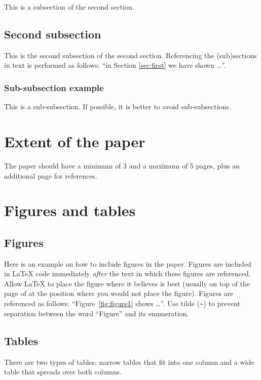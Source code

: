 \documentclass[10pt, a4paper]{article}
\begin{document}
This is a subsection of the second section.

\subsection{Second subsection}

This is the second subsection of the second section. Referencing the (sub)sections in text is performed as follows: ``in Section \ref{sec:first} we have shown \dots''.

\subsubsection{Sub-subsection example} 

This is a sub-subsection. If possible, it is better to avoid sub-subsections. 

\section{Extent of the paper}

The paper should have a minimum of 3 and a maximum of 5 pages, plus an additional page for references.

\section{Figures and tables}

\subsection{Figures}

Here is an example on how to include figures in the paper. Figures are included in \LaTeX{} code immediately \textit{after} the text in which these figures are referenced. Allow \LaTeX{} to place the figure where it believes is best (usually on top of the page of at the position where you would not place the figure). Figures are referenced as follows: ``Figure~\ref{fig:figure1} shows \dots''. Use tilde (\verb.~.) to prevent separation between the word ``Figure'' and its enumeration.

\subsection{Tables}

There are two types of tables: narrow tables that fit into one column and a wide table that spreads over both columns.
\end{document}
